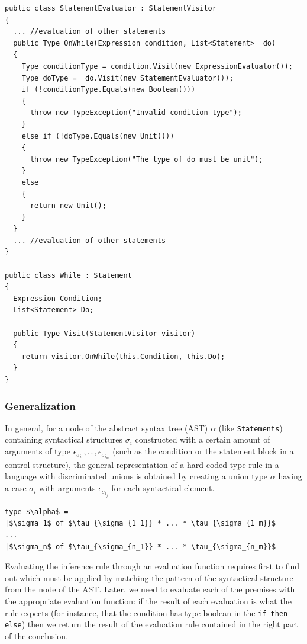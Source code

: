 \begin{lstlisting}
public class StatementEvaluator : StatementVisitor
{
  ... //evaluation of other statements
  public Type OnWhile(Expression condition, List<Statement> _do)
  {
    Type conditionType = condition.Visit(new ExpressionEvaluator());
    Type doType = _do.Visit(new StatementEvaluator());
    if (!conditionType.Equals(new Boolean()))
    {
      throw new TypeException("Invalid condition type");
    }
    else if (!doType.Equals(new Unit()))
    {
      throw new TypeException("The type of do must be unit");
    }
    else
    {
      return new Unit();
    }
  }
  ... //evaluation of other statements
}

public class While : Statement
{
  Expression Condition;
  List<Statement> Do;
  
  public Type Visit(StatementVisitor visitor)
  {
    return visitor.OnWhile(this.Condition, this.Do);
  }
}
\end{lstlisting}

\subsubsection{Generalization}
\label{sec:ch_metacasanova_inference_rule_generalization}

In general, for a node of the abstract syntax tree (AST) $\alpha$ (like \texttt{Statements}) containing syntactical structures $\sigma_{i}$ constructed with a certain amount of arguments of type $\epsilon_{\sigma_{i_1}}, ..., \epsilon_{\sigma_{i_m}}$ (such as the condition or the statement block in a control structure), the general representation of a hard-coded type rule in a language with discriminated unions is obtained by creating a union type $\alpha$ having a case $\sigma_{i}$ with arguments $\epsilon_{\sigma_{i_j}}$ for each syntactical element.

\begin{lstlisting}[mathescape = true]
type $\alpha$ =
|$\sigma_1$ of $\tau_{\sigma_{1_1}} * ... * \tau_{\sigma_{1_m}}$
...
|$\sigma_n$ of $\tau_{\sigma_{n_1}} * ... * \tau_{\sigma_{n_m}}$
\end{lstlisting}

Evaluating the inference rule through an evaluation function requires first to find out which must be applied by matching the pattern of the syntactical structure from the node of the AST. Later, we need to evaluate each of the premises with the appropriate evaluation function: if the result of each evaluation is what the rule expects (for instance, that the condition has type boolean in the \texttt{if-then-else}) then we return the result of the evaluation rule contained in the right part of the conclusion.

